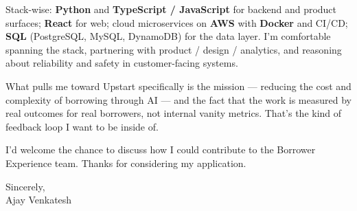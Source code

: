 \documentclass[letterpaper,11pt]{article}
\begin{document}
Stack-wise: \textbf{Python} and \textbf{TypeScript / JavaScript} for backend and product surfaces; \textbf{React} for web; cloud microservices on \textbf{AWS} with \textbf{Docker} and CI/CD; \textbf{SQL} (PostgreSQL, MySQL, DynamoDB) for the data layer. I'm comfortable spanning the stack, partnering with product / design / analytics, and reasoning about reliability and safety in customer-facing systems.

What pulls me toward Upstart specifically is the mission --- reducing the cost and complexity of borrowing through AI --- and the fact that the work is measured by real outcomes for real borrowers, not internal vanity metrics. That's the kind of feedback loop I want to be inside of.

I'd welcome the chance to discuss how I could contribute to the Borrower Experience team. Thanks for considering my application.

\vspace{12pt}

Sincerely, \\
Ajay Venkatesh
\end{document}

